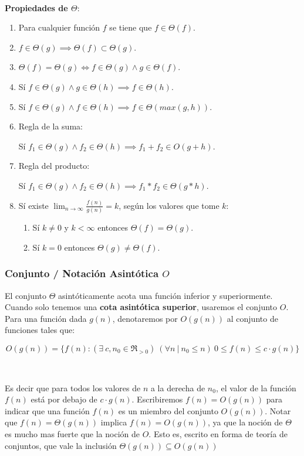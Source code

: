 ~

\textbf{Propiedades de $\Theta$}:
\begin{enumerate}
 \item Para cualquier funci\'on $f$ se tiene que $f \in \Theta(f)$.
 \item $f \in \Theta(g) \implies \Theta(f) \subset \Theta(g)$.
 \item $\Theta(f) = \Theta(g) \iff f \in \Theta(g) \land g \in \Theta(f)$.
 \item S\'i $f \in \Theta(g) \land g \in \Theta(h) \implies f \in \Theta(h)$.
 \item S\'i $f \in \Theta(g) \land f \in \Theta(h) \implies f \in \Theta(max(g,h))$.
 \item Regla de la suma:

	S\'i $f_1 \in \Theta(g) \land f_2 \in \Theta(h) \implies f_1 + f_2 \in O(g+h)$.
 \item Regla del producto:

	S\'i $f_1 \in \Theta(g) \land f_2 \in \Theta(h) \implies f_1 * f_2 \in \Theta(g*h)$.
 \item S\'i existe $\lim_{n \to \infty} \frac{f(n)}{g(n)} = k$, seg\'un los valores que tome $k$:
	\begin{enumerate}
	  \item S\'i $k \neq 0$ y $k < \infty$ entonces $\Theta(f) = \Theta(g)$.
	  \item S\'i $k = 0$ entonces $\Theta(g) \neq \Theta(f)$.
	\end{enumerate}
\end{enumerate}

\subsubsection{Conjunto / Notaci\'on Asint\'otica $O$}

El conjunto $\Theta$ asint\'oticamente acota una funci\'on inferior y superiormente. Cuando solo tenemos una \textbf{cota asint\'otica superior}, usaremos el conjunto $O$. Para una funci\'on dada $g(n)$, denotaremos por $O(g(n))$ al conjunto de funciones tales que:

\begin{equation*}
 O(g(n)) = \{ f(n) : (\exists\ c, n_0 \in \Re_{>0}) \ (\forall n\ |\ n_0 \leq n)\ 0 \leq f(n) \leq c \cdot g(n) \}
\end{equation*}

~

Es decir que para todos los valores de $n$ a la derecha de $n_0$, el valor de la funci\'on $f(n)$ est\'a por debajo de $c \cdot g(n)$. Escribiremos $f(n) = O(g(n))$ para indicar que una funci\'on $f(n)$ es un miembro del conjunto $O(g(n))$. Notar que $f(n) = \Theta(g(n))$ implica $f(n) = O(g(n))$, ya que la noci\'on de $\Theta$ es mucho mas fuerte que la noci\'on de $O$. Esto es, escrito en forma de teor\'ia de conjuntos, que vale la inclusi\'on $\Theta(g(n)) \subseteq O(g(n))$

